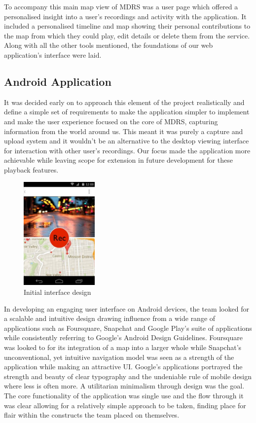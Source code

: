 \documentclass{l3proj}
\begin{document}
To accompany this main map view of MDRS was a user page which offered a
personalised insight into a user's recordings and activity with the application.
It included a personalised timeline and map showing their personal contributions
to the map from which they could play, edit details or delete them from the
service. Along with all the other tools mentioned, the foundations of our
web application's interface were laid.

\subsection{Android Application} It was decided early on to approach this
element of the project realistically and define a simple set of requirements to
make the application simpler to implement and make the user experience focused
on the core of MDRS, capturing information from the world around us. This meant
it was purely a capture and upload system and it wouldn't be an alternative to
the desktop viewing interface for interaction with other user's recordings. Our
focus made the application more achievable while leaving scope for extension in
future development for these playback features.

\begin{figure}
\begin{center}
  \includegraphics[width=0.34\textwidth]{images/android-digital-prototype-1.jpg}
\end{center}
\caption{Initial interface design}
\end{figure}

In developing an engaging user interface on Android devices, the team looked for
a scalable and intuitive design drawing influence from a wide range of
applications such as Foursquare, Snapchat and Google Play’s suite of
applications while consistently referring to Google's Android Design Guidelines.
Foursquare was looked to for its integration of a map into a larger whole while
Snapchat's unconventional, yet intuitive navigation model was seen as a strength
of the application while making an attractive UI. Google's applications
portrayed the strength and beauty of clear typography and the undeniable rule of
mobile design where less is often more. A utilitarian minimalism through design
was the goal. The core functionality of the application was single use and the
flow through it was clear allowing for a relatively simple approach to be taken,
finding place for flair within the constructs the team placed on themselves.
\end{document}
